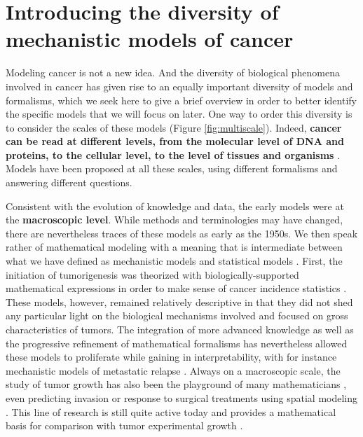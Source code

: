 \documentclass[a4paper,12pt,twoside,onecolumn,openright,final,oldfontcommands]{memoir}
\begin{document}
\section{Introducing the diversity of mechanistic models of
cancer}\label{mechanistic-family}

Modeling cancer is not a new idea. And the diversity of biological
phenomena involved in cancer has given rise to an equally important
diversity of models and formalisms, which we seek here to give a brief
overview in order to better identify the specific models that we will
focus on later. One way to order this diversity is to consider the
scales of these models (Figure \ref{fig:multiscale}). Indeed,
\textbf{cancer can be read at different levels, from the molecular level
of DNA and proteins, to the cellular level, to the level of tissues and
organisms} \citep{anderson2008integrative}. Models have been proposed at
all these scales, using different formalisms
\citep{bellomo2008foundations} and answering different questions.

Consistent with the evolution of knowledge and data, the early models
were at the \textbf{macroscopic level}. While methods and terminologies
may have changed, there are nevertheless traces of these models as early
as the 1950s. We then speak rather of mathematical modeling with a
meaning that is intermediate between what we have defined as mechanistic
models and statistical models \citep{byrne2010dissecting}. First, the
initiation of tumorigenesis was theorized with biologically-supported
mathematical expressions in order to make sense of cancer incidence
statistics \citep{armitage1954age, knudson1971mutation}. These models,
however, remained relatively descriptive in that they did not shed any
particular light on the biological mechanisms involved and focused on
gross characteristics of tumors. The integration of more advanced
knowledge as well as the progressive refinement of mathematical
formalisms has nevertheless allowed these models to proliferate while
gaining in interpretability, with for instance mechanistic models of
metastatic relapse \citep{nicolo2020machine}. Always on a macroscopic
scale, the study of tumor growth has also been the playground of many
mathematicians \citep{araujo2004history, byrne2010dissecting}, even
predicting invasion or response to surgical treatments using spatial
modeling \citep{swanson2003virtual}. This line of research is still
quite active today and provides a mathematical basis for comparison with
tumor experimental growth \citep{benzekry2014classical}.
\end{document}
